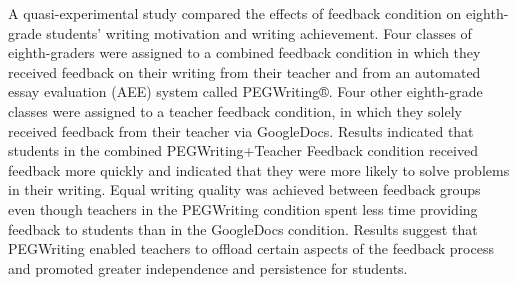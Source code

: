A quasi-experimental study compared the effects of feedback condition on eighth-grade students' writing motivation and writing achievement. Four classes of eighth-graders were assigned to a combined feedback condition in which they received feedback on their writing from their teacher and from an automated essay evaluation (AEE) system called PEGWriting®. Four other eighth-grade classes were assigned to a teacher feedback condition, in which they solely received feedback from their teacher via GoogleDocs. Results indicated that students in the combined PEGWriting+Teacher Feedback condition received feedback more quickly and indicated that they were more likely to solve problems in their writing. Equal writing quality was achieved between feedback groups even though teachers in the PEGWriting condition spent less time providing feedback to students than in the GoogleDocs condition. Results suggest that PEGWriting enabled teachers to offload certain aspects of the feedback process and promoted greater independence and persistence for students.
